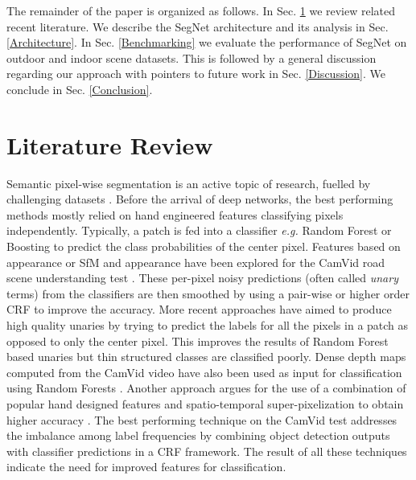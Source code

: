 \documentclass[10pt,journal,compsoc]{IEEEtran}
\begin{document}
The remainder of the paper is organized as follows. In Sec. \ref{LitReview} we review related recent literature. We describe the SegNet architecture and its analysis in Sec. \ref{Architecture}. In Sec. \ref{Benchmarking} we evaluate the performance of SegNet on outdoor and indoor scene datasets. This is followed by a general discussion regarding our approach with pointers to future work in Sec. \ref{Discussion}. We conclude in Sec. \ref{Conclusion}. 

\section{Literature Review}
\label{LitReview}

Semantic pixel-wise segmentation is an active topic of research, fuelled by challenging datasets \cite{GabeDataset,silberman2012indoor,GeigerKITTI,Pascal,song2015sun}. Before the arrival of deep networks, the best performing methods mostly relied on hand engineered features classifying pixels independently. Typically, a patch is fed into a classifier \textit{e.g.} Random Forest \cite{Jamie2,Brostow} or Boosting \cite{Sturgess,LadickyECCV} to predict the class probabilities of the center pixel. Features based on appearance \cite{Jamie2} or SfM and appearance \cite{Brostow,Sturgess, LadickyECCV} have been explored for the CamVid road scene understanding test \cite{GabeDataset}. These per-pixel noisy predictions (often called \textit{unary} terms) from the classifiers are then smoothed by using a pair-wise or higher order CRF \cite{Sturgess,LadickyECCV} to improve the accuracy. More recent approaches have aimed to produce high quality unaries by trying to predict the labels for all the pixels in a patch as opposed to only the center pixel. This improves the results of Random Forest based unaries \cite{kontschieder2011structured} but thin structured classes are classified poorly. Dense depth maps computed from the CamVid video have also been used as input for classification using Random Forests \cite{zhang2010semantic}. Another approach argues for the use of a combination of popular hand designed features and spatio-temporal super-pixelization to obtain higher accuracy \cite{tighe2013superparsing}. The best performing technique on the CamVid test \cite{LadickyECCV} addresses the imbalance among label frequencies by combining object detection outputs with classifier predictions in a CRF framework. The result of all these techniques indicate the need for improved features for  classification.  
\end{document}
